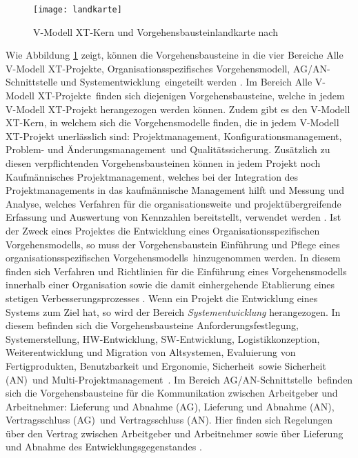 \begin{figure}[htp]
\begin{center}
  \texttt{[image: landkarte]} %
  \caption{V-Modell XT-Kern und Vorgehensbausteinlandkarte nach \cite{2004vmodell}}
  \label{fig:landkarte}
\end{center}
\end{figure}

 Wie Abbildung \ref{fig:landkarte} zeigt, können die Vorgehensbausteine in die vier Bereiche \grqq Alle V-Modell XT-Projekte\grqq, \grqq Organisationsspezifisches Vorgehensmodell, \grqq AG/AN-Schnittstelle und \grqq Systementwicklung\grqq \  eingeteilt werden \cite{2004vmodell}.\newline
 Im Bereich \grqq Alle V-Modell XT-Projekte\grqq \ finden sich diejenigen Vorgehensbausteine, welche in jedem V-Modell XT-Projekt herangezogen werden können. Zudem gibt es den V-Modell XT-Kern, in welchem sich die Vorgehensmodelle finden, die in jedem V-Modell XT-Projekt unerlässlich sind: \grqq Projektmanagement\grqq, \grqq Konfigurationsmanagement\grqq, \grqq Problem- und Änderungsmanagement\grqq \ und \grqq Qualitätssicherung\grqq. Zusätzlich zu diesen verpflichtenden Vorgehensbausteinen können in jedem Projekt noch \grqq Kaufmännisches Projektmanagement\grqq, welches bei der Integration des Projektmanagements in das kaufmännische Management hilft und \grqq Messung und Analyse\grqq, welches Verfahren für die organisationsweite und projektübergreifende Erfassung und Auswertung von Kennzahlen bereitstellt, verwendet werden \cite{2004vmodell}.\newline
 Ist der Zweck eines Projektes die Entwicklung eines \grqq Organisationsspezifischen Vorgehensmodells\grqq, so muss der Vorgehensbaustein \grqq Einführung und Pflege eines organisationsspezifischen Vorgehensmodells\grqq \ hinzugenommen werden. In diesem finden sich Verfahren und Richtlinien für die Einführung eines Vorgehensmodells innerhalb einer Organisation sowie die damit einhergehende Etablierung eines stetigen Verbesserungsprozesses \cite{2004vmodell}.\newline
 Wenn ein Projekt die Entwicklung eines Systems zum Ziel hat, so wird der Bereich \textit{Systementwicklung} herangezogen. In diesem befinden sich die Vorgehensbausteine \grqq Anforderungsfestlegung\grqq, \grqq Systemerstellung\grqq, \grqq HW-Entwicklung\grqq, \grqq SW-Entwicklung\grqq, \grqq Logistikkonzeption\grqq, \grqq Weiterentwicklung und Migration von Altsystemen\grqq, \grqq Evaluierung von Fertigprodukten\grqq, \grqq Benutzbarkeit und Ergonomie\grqq, \grqq Sicherheit\grqq \ sowie \grqq Sicherheit (AN)\grqq \ und \grqq Multi-Projektmanagement\grqq \ \cite{2004vmodell}. \newline
 Im Bereich \grqq AG/AN-Schnittstelle\grqq \ befinden sich die Vorgehensbausteine für die Kommunikation zwischen Arbeitgeber und Arbeitnehmer: \grqq Lieferung und Abnahme (AG)\grqq, \grqq Lieferung und Abnahme (AN)\grqq, \grqq Vertragsschluss (AG)\grqq \ und \grqq Vertragsschluss (AN)\grqq. Hier finden sich Regelungen über den Vertrag zwischen Arbeitgeber und Arbeitnehmer sowie über Lieferung und Abnahme des Entwicklungsgegenstandes \cite{2004vmodell}. \newline
 
